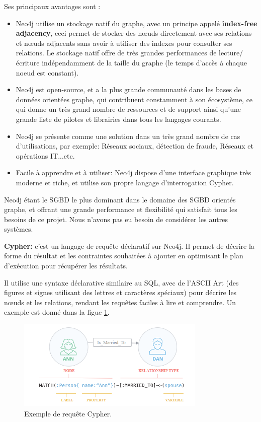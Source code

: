 Ses principaux avantages sont :
\begin{itemize}
	\item Neo4j utilise un stockage natif du graphe, avec un principe appelé \textbf{index-free adjacency}, ceci permet de stocker des nœuds directement avec ses relations et nœuds adjacents sans avoir à utiliser des indexes pour consulter ses relations.\newline
	Le stockage natif offre de très grandes performances de lecture/écriture indépendamment de la taille du graphe (le temps d'accès à chaque noeud est constant).
	\item Neo4j est open-source, et a la plus grande communauté dans les bases de données orientées graphe, qui contribuent constamment à son écosystème, ce qui donne un très grand nombre de ressources et de support ainsi qu'une grande liste de pilotes et librairies dans tous les langages courants.
	\item Neo4j se présente comme une solution dans un très grand nombre de cas d'utilisations, par exemple: Réseaux sociaux, détection de fraude, Réseaux et opérations IT...etc.
	\item Facile à apprendre et à utiliser: Neo4j dispose d'une interface graphique très moderne et riche, et utilise son propre langage d'interrogation Cypher.\newline
\end{itemize}

Neo4j étant le SGBD le plus dominant dans le domaine des SGBD orientés graphe, et offrant une grande performance et flexibilité qui satisfait tous les besoins de ce projet. Nous n'avons pas eu besoin de considérer les autres systèmes.

\textbf{Cypher: } c'est un langage de requête déclaratif sur Neo4j. Il permet de décrire la forme du résultat et les contraintes souhaitées à ajouter en optimisant le plan d'exécution pour récupérer les résultats.\newline

Il utilise une syntaxe déclarative similaire au SQL, avec de l'ASCII Art (des figures et signes utilisant des lettres et caractères spéciaux) pour décrire les nœuds et les relations, rendant les requêtes faciles à lire et comprendre. Un exemple est donné dans la figue \ref{fig:cypher}.

\begin{figure}
	\center
	\includegraphics[width=0.8\textwidth]{img/cypher.png}
	\caption{Exemple de requête Cypher.}
	\label{fig:cypher}
\end{figure}

